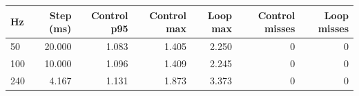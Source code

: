 \begin{tabular}{lrrrrrr}
\toprule
Hz & Step (ms) & Control p95 & Control max & Loop max & Control misses & Loop misses \\
\midrule
50 & 20.000 & 1.083 & 1.405 & 2.250 & 0 & 0 \\
100 & 10.000 & 1.096 & 1.409 & 2.245 & 0 & 0 \\
240 & 4.167 & 1.131 & 1.873 & 3.373 & 0 & 0 \\
\bottomrule
\end{tabular}
